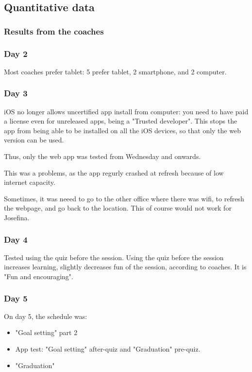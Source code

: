 \subsection{Quantitative data}


    \subsubsection{Results from the coaches}

    \subsubsection{Day 2}
    Most coaches prefer tablet: 5 prefer tablet, 2 smartphone, and 2 computer.

    \subsubsection{Day 3}
    iOS no longer allows uncertified app install from computer: you need to have paid a license even for unreleased apps, being a "Trusted developer". This stops the app from being able to be installed on all the iOS devices, so that only the web version can be used.

    Thus, only the web app was tested from Wednesday and onwards.

    This was a problems, as the app regurly crashed at refresh because of low internet capacity.

    Sometimes, it was neeed to go to the other office where there was wifi, to refresh the webpage, and go back to the location. This of course would not work for Josefina.

    \subsubsection{Day 4}
    Tested using the quiz before the session.  Using the quiz before the session increases learning, slightly decreases fun of the session, according to coaches. It is "Fun and encouraging".

    \subsubsection{Day 5}
    On day 5, the schedule was:

    \begin{itemize}
      \item "Goal setting" part 2
      \item App test: "Goal setting" after-quiz and "Graduation" pre-quiz.
      \item "Graduation"
    \end{itemize}

